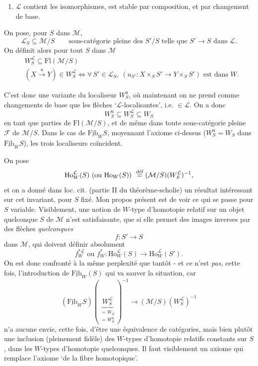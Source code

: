 \begin{enumerate}
\item[$(*)$] $\mathcal{L}$ contient les isomorphismes, est stable par composition, et par changement de base.
\end{enumerate}

On pose, pour $S$ dans $\mathcal{M}$,
\[
\mathcal{L}_S \subseteq \mathcal{M}/S \qquad \text{sous-catégorie pleine des } S'/S \text{ telle que } S' \longrightarrow S \text{ dans } \mathcal{L}.
\]
On définit alors pour tout $S$ dans $\mathcal{M}$
\[
\begin{aligned}
&W^{\mathcal{L}}_S \subseteq \mathrm{Fl}(\mathcal{M}/S)\\
&(X \xrightarrow{u} Y) \in W^{\mathcal{L}}_S \iff \forall\, S' \in \mathcal{L}_S,\ (u_{S'} : X \times_S S' \longrightarrow Y \times_S S') \text{ est dans } W.
\end{aligned}
\]


C'est donc une variante du localiseur $W^{\mathrm{u}}_S$, où maintenant on ne prend comme changements de base que les flèches `$\mathcal{L}$-localisantes', i.e. $\in \mathcal{L}$. On a donc
\[
W^{\mathrm{u}}_S \subseteq W^{\mathcal{L}}_S \subseteq W_S
\]
en tant que parties de $\mathrm{Fl}(\mathcal{M}/S)$, et de même dans toute sous-catégorie pleine $\mathcal{F}$ de $\mathcal{M}/S$. Dans le cas de $\underline{\mathrm{Fib}}_W S$, moyennant l'axiome  ci-dessus ($W^{\mathrm{u}}_S = W_S$ dans $\underline{\mathrm{Fib}}_W S$), les trois localiseurs coïncident.

On pose
\[
\mathrm{Ho}^{\mathcal{L}}_W(S) \text{ (ou } \mathrm{Ho}_W(S)\text{)} \ \deff (\mathcal{M}/S)(W^{\mathcal{L}}_S)^{-1},
\]
et on a donné dans loc. cit. (partie II du théorème-scholie) un résultat intéressant sur cet invariant, pour $S$ fixé. Mon propos
présent est de voir ce qui se passe pour $S$ variable. Visiblement, une notion de $W$-type d'homotopie relatif sur un objet quelconque $S$ de $\mathcal{M}$ n'est satisfaisante, que si elle permet des images inverses par des flèches \textit{quelconques}
\[
f : S' \longrightarrow S
\]
dans $\mathcal{M}$, qui doivent définir absolument
\[
f^{*\mathcal{L}}_W \text{ ou } f^*_W : \mathrm{Ho}^{\mathcal{L}}_W(S) \longrightarrow \mathrm{Ho}^{\mathcal{L}}_W(S').
\]
On est donc confronté à la même perplexité que tantôt - et ce n'est \textit{pas,} cette fois, l'introduction de $\underline{\mathrm{Fib}}_W(S)$ qui va sauver la situation, car
\[
(\underline{\mathrm{Fib}}_W S)(\underbrace{W^{\mathcal{L}}_S}_{\substack{= W_S \\ = W^{\mathrm{u}}_S}})^{-1} \longrightarrow (\mathcal{M}/S)(W^{\mathcal{L}}_S)^{-1}
\]
n'a aucune envie, cette fois, d'être une équivalence de catégories, mais bien plutôt une inclusion (pleinement fidèle) des $W$-types d'homotopie relatifs constants sur $S$, dans les $W$-types d'homotopie quelconques. Il faut visiblement un axiome qui remplace l'axiome `de la fibre homotopique'.

